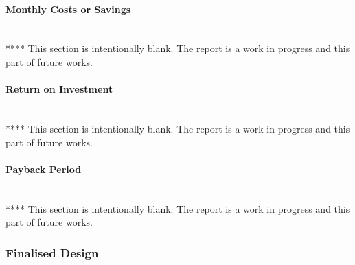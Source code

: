 \paragraph{Monthly Costs or Savings}
~\\
****
\newline
This section is intentionally blank. The report is a work in progress and this part of future works.  

\paragraph{Return on Investment}
~\\
****
\newline
This section is intentionally blank. The report is a work in progress and this part of future works.  

\paragraph{Payback Period}
~\\
****
\newline
This section is intentionally blank. The report is a work in progress and this part of future works.  

\subsubsection{Finalised Design}


